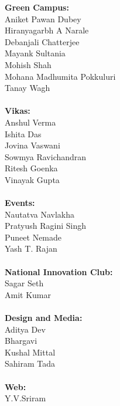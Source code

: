 \pagebreak

\noindent \textbf{\Large Green Campus:}\\
Aniket Pawan Dubey\\
Hiranyagarbh A Narale\\
Debanjali Chatterjee\\
Mayank Sultania\\
Mohish Shah\\
Mohana Madhumita Pokkuluri
\\
Tanay Wagh\\ \\
\noindent \textbf{\large Vikas:}\\
Anshul Verma \\
Ishita Das \\
Jovina Vaswani \\
Sowmya Ravichandran
 \\
Ritesh Goenka \\
Vinayak Gupta\\ \\

\noindent \textbf{\large Events:}\\
Nautatva Navlakha \\
Pratyush Ragini Singh\\
Puneet Nemade\\
Yash T. Rajan\\
\\
\noindent \textbf{\large National Innovation Club:}\\
Sagar Seth \\
Amit Kumar \\ \\
\noindent \textbf{\large Design and Media:}\\
Aditya Dev\\
Bhargavi\\
Kushal Mittal\\
Sahiram Tada\\ \\
\noindent \textbf{\large Web:}\\
Y.V.Sriram\\



